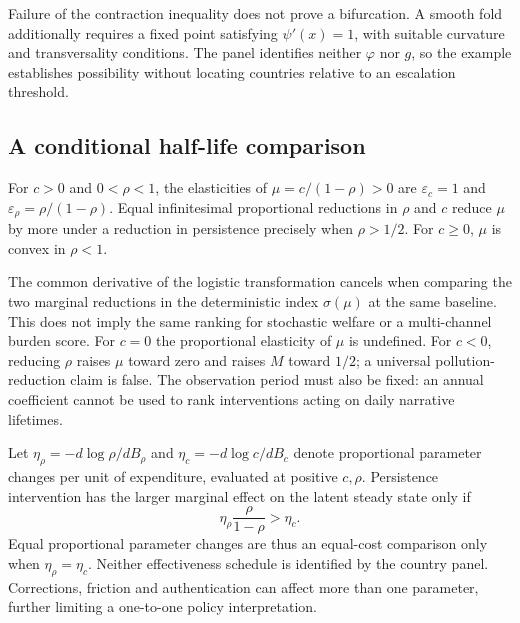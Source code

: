 \begin{samepage}
Failure of the contraction inequality does not prove a bifurcation. A smooth
fold additionally requires a fixed point satisfying $\psi'(x)=1$, with
suitable curvature and transversality conditions. The panel identifies
neither $\varphi$ nor $g$, so the example establishes possibility without
locating countries relative to an escalation threshold.

\subsection{A conditional half-life comparison}\label{subsec:burden}
\begin{proposition}
\label{prop:burden}
For $c>0$ and $0<\rho<1$, the elasticities of
$\mu=c/(1-\rho)>0$ are $\varepsilon_c=1$ and
$\varepsilon_\rho=\rho/(1-\rho)$. Equal infinitesimal proportional reductions
in $\rho$ and $c$ reduce $\mu$ by more under a reduction in persistence precisely when
$\rho>1/2$. For $c\ge0$, $\mu$ is convex in $\rho<1$.
\end{proposition}
\end{samepage}

The common derivative of the logistic transformation cancels when comparing
the two marginal reductions in the deterministic index $\sigma(\mu)$ at
the same baseline. This does not imply the same ranking for stochastic
welfare or a multi-channel burden score. For $c=0$ the proportional elasticity
of $\mu$ is undefined. For $c<0$, reducing $\rho$ raises $\mu$ toward zero
and raises $M$ toward $1/2$; a universal pollution-reduction claim is false.
The observation period must also be fixed: an annual coefficient cannot be
used to rank interventions acting on daily narrative lifetimes.

Let $\eta_\rho=-d\log\rho/dB_\rho$ and
$\eta_c=-d\log c/dB_c$ denote proportional parameter changes per unit of
expenditure, evaluated at positive $c,\rho$. Persistence intervention has the
larger marginal effect on the latent steady state only if
\begin{equation}\label{eq:cost}
 \eta_\rho\frac{\rho}{1-\rho}>\eta_c.
\end{equation}
Equal proportional parameter changes are thus an equal-cost comparison only
when $\eta_\rho=\eta_c$. Neither effectiveness schedule is identified by
the country panel. Corrections, friction and authentication can affect more
than one parameter, further limiting a one-to-one policy interpretation.
